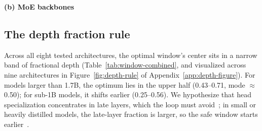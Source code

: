 \begin{table}[t]
\vspace{0.6em}
{\small\textbf{(b) MoE backbones}}\label{tab:headline-moe}\par
\small
\setlength{\tabcolsep}{10pt}
\renewcommand{\arraystretch}{1.20}
\end{table}

\subsection{The depth fraction rule}
\label{sec:depth}

Across all eight tested architectures, the optimal window's center sits in a narrow band of fractional depth (Table~\ref{tab:window-combined}, and visualized across nine architectures in Figure~\ref{fig:depth-rule} of Appendix~\ref{app:depth-figure}). For models larger than 1.7B, the optimum lies in the upper half (0.43--0.71, mode $\approx$0.50); for sub-1B models, it shifts earlier (0.25--0.56). We hypothesize that head specialization concentrates in late layers, which the loop must avoid~\citep{belrose2023eliciting,lad2024remarkable,men2024short}; in small or heavily distilled models, the late-layer fraction is larger, so the safe window starts earlier~\citep{takase2021lessons,reid2021subformer}.


